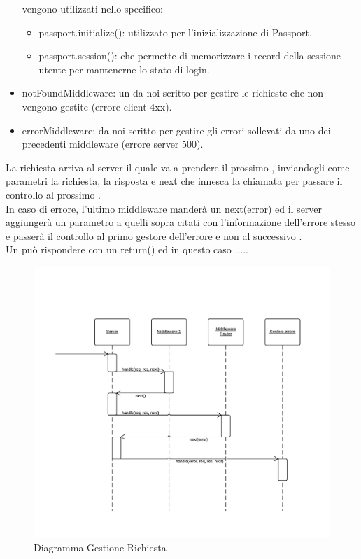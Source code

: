 \begin{itemize}
vengono utilizzati nello specifico:
	\begin{itemize}
	\item{passport.initialize()}:  utilizzato per l'inizializzazione di Passport.
	\item{passport.session()}:   che permette di memorizzare i record della sessione utente per mantenerne lo stato di login. 
	\end{itemize}
\item{notFoundMiddleware}: un  da noi scritto per gestire le richieste che non vengono gestite (errore client 4xx).
\item{errorMiddleware}:  da noi scritto per gestire gli errori sollevati da uno dei precedenti middleware (errore server 500).
\end{itemize}
La richiesta arriva al server il quale va a prendere il prossimo , inviandogli come parametri la richiesta, la risposta e next che innesca la chiamata per passare il controllo al prossimo .  \\
In caso di errore, l'ultimo middleware manderà un next(error) ed il server aggiungerà un parametro a quelli sopra citati con l'informazione dell'errore stesso e passerà il controllo al primo gestore dell'errore e non al successivo . \\
Un  può rispondere con un return() ed in questo caso ..... %

\begin{figure}[H]
	\begin{center} 
		\includegraphics[scale=0.30]{scenari/Diagramma Gestione Richiesta.png}  
		\caption{Diagramma Gestione Richiesta}
	\end{center} 
\end{figure} 

